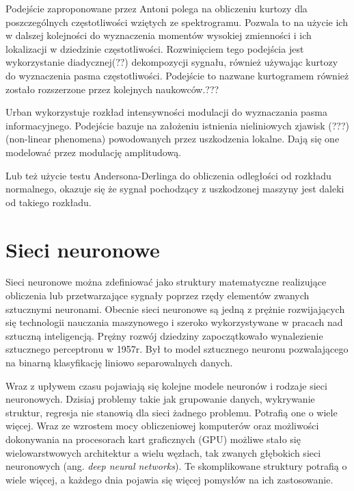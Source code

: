 \documentclass[inzynierska]{pwr_wmat_praca_dyplomowa}
\theoremstyle{plain}
\numberwithin{theorem}{chapter}
\theoremstyle{definition}
\numberwithin{theorem}{chapter}
\begin{document}
Podejście zaproponowane przez Antoni\cite{antoni} polega na obliczeniu kurtozy dla poszczególnych częstotliwości wziętych ze spektrogramu. Pozwala to na użycie ich w dalszej kolejności do wyznaczenia momentów wysokiej zmienności i ich lokalizacji w dziedzinie częstotliwości. Rozwinięciem tego podejścia jest wykorzystanie diadycznej(??) dekompozycji sygnału, również używając kurtozy do wyznaczenia pasma częstotliwości. Podejście to nazwane kurtogramem również zostało rozszerzone przez kolejnych naukowców.???\cite{antoni2}

Urban\cite{urban} wykorzystuje rozkład intensywności modulacji do wyznaczania pasma informacyjnego. Podejście bazuje na założeniu istnienia nieliniowych zjawisk (???) (non-linear phenomena) powodowanych przez uszkodzenia lokalne. Dają się one modelować przez modulację amplitudową. 

Lub też użycie testu Andersona-Derlinga do obliczenia odległości od rozkładu normalnego, okazuje się że sygnał pochodzący z uszkodzonej maszyny jest daleki od takiego rozkładu\cite{wylomanska}.


\section{Sieci neuronowe}
Sieci neuronowe można zdefiniować jako struktury matematyczne realizujące obliczenia lub przetwarzające sygnały poprzez rzędy elementów zwanych sztucznymi neuronami.
Obecnie sieci neuronowe są jedną z prężnie rozwijających się technologii nauczania maszynowego i szeroko wykorzystywane w pracach nad sztuczną inteligencją.
Prężny rozwój dziedziny zapoczątkowało wynalezienie sztucznego perceptronu w 1957r. Był to model sztucznego neuronu pozwalającego na binarną klasyfikację liniowo separowalnych danych.

Wraz z upływem czasu pojawiają się kolejne modele neuronów i rodzaje sieci neuronowych. Dzisiaj problemy takie jak grupowanie danych, wykrywanie struktur, regresja nie stanowią dla sieci żadnego problemu. Potrafią one o wiele więcej. Wraz ze wzrostem mocy obliczeniowej komputerów oraz możliwości dokonywania na procesorach kart graficznych (GPU) możliwe stało się wielowarstwowych architektur a wielu węzłach, tak zwanych głębokich sieci neuronowych (ang. \textit{deep neural networks}). Te skomplikowane struktury potrafią o wiele więcej, a każdego dnia pojawia się więcej pomysłów na ich zastosowanie. 
\end{document}
